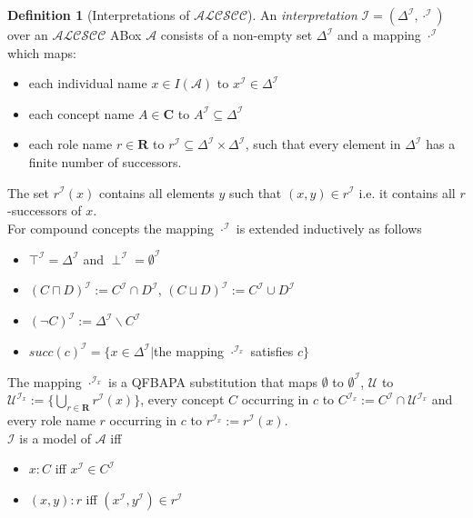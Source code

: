 \documentclass{book}
\theoremstyle{break}
\theoremstyle{definition}
\newtheorem{mydef}{Definition}
\begin{document}
\begin{mydef}[Interpretations of $\mathcal{ALCSCC}$]
An \textit{interpretation} $\mathcal{I}=(\Delta^\mathcal{I},\cdot^\mathcal{I})$ over an $\mathcal{ALCSCC}$ ABox $\mathcal{A}$ consists of a non-empty set $\Delta^\mathcal{I}$ and a mapping $\cdot^\mathcal{I}$ which maps:
\begin{itemize}
\item each individual name $x\in I(\mathcal{A})$ to $x^\mathcal{I}\in \Delta^\mathcal{I}$
\item each concept name $A\in\mathbf{C}$ to $A^\mathcal{I}\subseteq \Delta^\mathcal{I}$
\item each role name $r\in\mathbf{R}$ to $r^\mathcal{I}\subseteq\Delta^\mathcal{I}\times\Delta^\mathcal{I}$, such that every element in $\Delta^\mathcal{I}$ has a finite number of successors.
\end{itemize}
The set $r^\mathcal{I}(x)$ contains all elements $y$ such that $(x,y)\in r^\mathcal{I}$ i.e. it contains all $r$-successors of $x$.\\
For compound concepts the mapping $\cdot^\mathcal{I}$ is extended inductively as follows
\begin{itemize}
\item $\top^\mathcal{I}=\Delta^\mathcal{I}$ and $\perp^\mathcal{I}=\emptyset^\mathcal{I}$
\item $(C\sqcap D)^\mathcal{I}:=C^\mathcal{I}\cap D^\mathcal{I}$, $(C\sqcup D)^\mathcal{I}:=C^\mathcal{I}\cup D^\mathcal{I}$
\item $(\neg C)^\mathcal{I}:=\Delta^\mathcal{I}\backslash C^\mathcal{I}$
\item $succ(c)^\mathcal{I}=\{x\in \Delta^\mathcal{I}|$the mapping $\cdot^{\mathcal{I}_x}$ satisfies $c\}$
\end{itemize}
The mapping $\cdot^{\mathcal{I}_x}$ is a QFBAPA substitution that maps $\emptyset$ to $\emptyset^\mathcal{I}$, $\mathcal{U}$ to $\mathcal{U}^{\mathcal{I}_x}:=\{\bigcup_{r\in\mathbf{R}}r^\mathcal{I}(x)\}$, every concept $C$ occurring in $c$ to $C^{\mathcal{I}_x}:=C^\mathcal{I}\cap \mathcal{U}^{\mathcal{I}_x}$ and every role name $r$ occurring in $c$ to $r^{\mathcal{I}_x}:=r^\mathcal{I}(x)$.\\
$\mathcal{I}$ is a model of $\mathcal{A}$ iff
\begin{itemize}
\item $x:C$ iff $x^\mathcal{I}\in C^\mathcal{I}$ 
\item $(x,y):r$ iff $(x^\mathcal{I},y^\mathcal{I})\in r^\mathcal{I}$
\end{itemize} 
\end{mydef}
\end{document}
